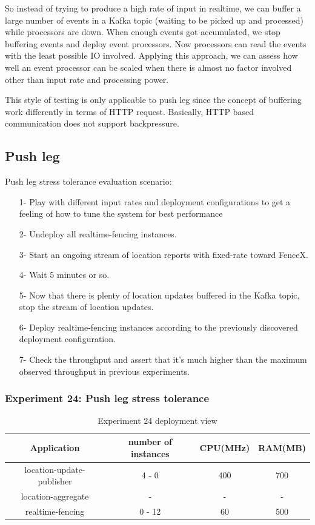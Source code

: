 \documentclass[a4]{report}
\begin{document}
    So instead of trying to produce a high rate of input in realtime, we can buffer a large number of events in a Kafka
    topic (waiting to be picked up and processed) while processors are down.
    When enough events got accumulated, we stop buffering events and deploy event processors.
    Now processors can read the events with the least possible IO involved.
    Applying this approach, we can assess how well an event processor can be scaled when there is almost no factor involved other than input rate and processing power.

    This style of testing is only applicable to push leg since the concept of buffering work differently in terms of
    HTTP request.
    Basically, HTTP based communication does not support backpressure.

    \subsection{Push leg}
    Push leg stress tolerance evaluation scenario:
    \begin{itemize}
        \item[1-] Play with different input rates and deployment configurations to get a feeling of how to tune the
        system for best performance
        \item[2-] Undeploy all realtime-fencing instances.
        \item[3-] Start an ongoing stream of location reports with fixed-rate toward FenceX.
        \item[4-] Wait 5 minutes or so.
        \item[5-] Now that there is plenty of location updates buffered in the Kafka topic, stop the stream of location updates.
        \item[6-] Deploy realtime-fencing instances according to the previously discovered deployment configuration.
        \item[7-] Check the throughput and assert that it's much higher than the maximum observed throughput in previous experiments.
    \end{itemize}

    \subsubsection{Experiment 24: Push leg stress tolerance}
    \begin{table}[h!]
        \centering
        \begin{tabular}{|c|c|c|c|}
            \hline
            Application               & number of instances & CPU(MHz) & RAM(MB) \\
            \hline
            location-update-publisher & 4 - 0               & 400      & 700     \\
            location-aggregate        & -                   & -        & -       \\
            realtime-fencing          & 0 - 12              & 60       & 500     \\
            \hline
        \end{tabular}
        \caption{Experiment 24 deployment view}
        \label{table:ex24-dv}
    \end{table}
\end{document}
